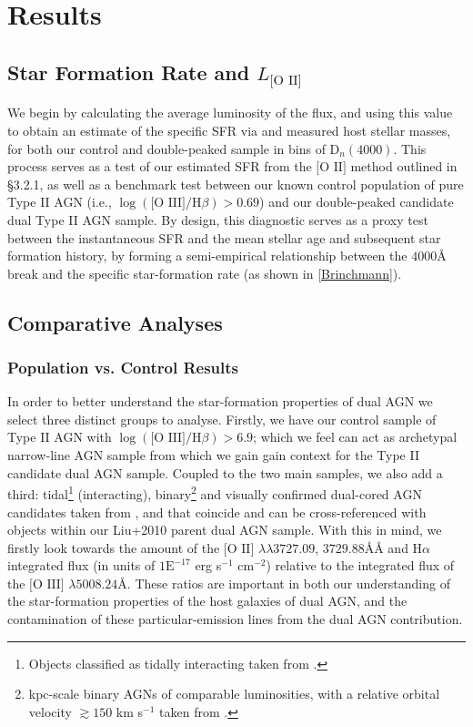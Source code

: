 \section{Results}
\subsection{Star Formation Rate and $L_{\text{[O II]}}$}

We begin by calculating the average luminosity of the \text{[O II]} flux, and using this value to obtain an estimate of the specific SFR via \label{eq:Kewley} and measured host stellar masses, for both our control and double-peaked sample in bins of $\text{D}_n(4000)$. This process serves as a test of our estimated SFR from the $\text{[O II]}$ method outlined in §3.2.1, as well as a benchmark test between our known control population of pure Type II AGN (i.e., $\log{(\text{[O III]}/\text{H}\beta)}>{0.69}$) and our double-peaked candidate dual Type II AGN sample. By design, this diagnostic serves as a proxy test between the instantaneous SFR and the mean stellar age and subsequent star formation history, by forming a semi-empirical relationship between the $4000Å$ break and the specific star-formation rate (as shown in \ref{Brinchmann}). 

\subsection{Comparative Analyses}
\subsubsection{Population vs. Control Results}

In order to better understand the star-formation properties of dual AGN we select three distinct groups to analyse. Firstly, we have our control sample of Type II AGN with $\log{(\text{[O III]}/\text{H}\beta)}>{6.9}$; which we feel can act as archetypal narrow-line AGN sample from which we gain gain context for the Type II candidate dual AGN sample. Coupled to the two main samples, we also add a third: tidal\footnote{\tiny{Objects classified as tidally interacting taken from \cite{Liu_2011}.}} (interacting), binary\footnote{\tiny{kpc-scale binary AGNs of comparable luminosities, with a relative orbital velocity $\gtrsim{150}$ km s$^{-1}$ taken from \cite{Shen_Liu_Greene_Strauss_2011}.}} and visually confirmed dual-cored AGN candidates taken from \cite{Ge_Hu_Wang_Bai_Zhang_2012}, and that coincide and can be cross-referenced with objects within our Liu+2010 parent dual AGN sample. With this in mind, we firstly look towards the amount of the $\text{[O II]}$ $\lambda\lambda$$3727.09$, $3729.88$\AA\AA{} and $\text{H}\alpha$ integrated flux (in units of $1\text{E}^{-17}$ erg s$^{-1}$ cm$^{-2}$) relative to the integrated flux of the $\text{[O III]}$ $\lambda$$5008.24$\AA. These ratios are important in both our understanding of the star-formation properties of the host galaxies of dual AGN, and the contamination of these particular-emission lines from the dual AGN contribution.

